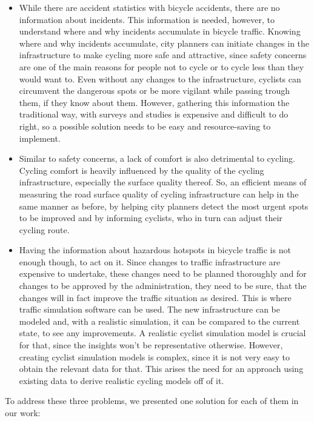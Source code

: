\begin{itemize}
\item While there are accident statistics with bicycle accidents, there are no information about incidents.
This information is needed, however, to understand where and why incidents accumulate in bicycle traffic.
Knowing where and why incidents accumulate, city planners can initiate changes in the infrastructure to make cycling more safe and attractive, since safety concerns are one of the main reasons for people not to cycle or to cycle less than they would want to.
Even without any changes to the infrastructure, cyclists can circumvent the dangerous spots or be more vigilant while passing trough them, if they know about them.
However, gathering this information the traditional way, with surveys and studies is expensive and difficult to do right, so a possible solution needs to be easy and resource-saving to implement.
\item Similar to safety concerns, a lack of comfort is also detrimental to cycling.
Cycling comfort is heavily influenced by the quality of the cycling infrastructure, especially the surface quality thereof.
So, an efficient means of measuring the road surface quality of cycling infrastructure can help in the same manner as before, by helping city planners detect the most urgent spots to be improved and by informing cyclists, who in turn can adjust their cycling route.
\item Having the information about hazardous hotspots in bicycle traffic is not enough though, to act on it.
Since changes to traffic infrastructure are expensive to undertake, these changes need to be planned thoroughly and for changes to be approved by the administration, they need to be sure, that the changes will in fact improve the traffic situation as desired.
This is where traffic simulation software can be used.
The new infrastructure can be modeled and, with a realistic simulation, it can be compared to the current state, to see any improvements.
A realistic cyclist simulation model is crucial for that, since the insights won't be representative otherwise.
However, creating cyclist simulation models is complex, since it is not very easy to obtain the relevant data for that.
This arises the need for an approach using existing data to derive realistic cycling models off of it.
\end{itemize}

To address these three problems, we presented one solution for each of them in our work:

